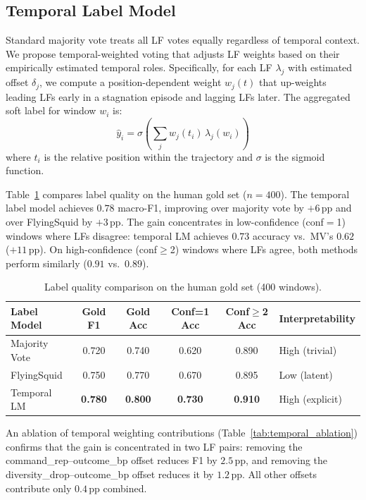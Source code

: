 \documentclass[11pt]{article}
\begin{document}
\subsection{Temporal Label Model}
\label{sec:temporal_lm}

Standard majority vote treats all LF votes equally regardless of temporal context.
We propose temporal-weighted voting that adjusts LF weights based on their empirically estimated temporal roles.
Specifically, for each LF $\lambda_j$ with estimated offset $\delta_j$, we compute a position-dependent weight $w_j(t)$ that up-weights leading LFs early in a stagnation episode and lagging LFs later.
The aggregated soft label for window $w_i$ is:
\[
\hat{y}_i = \sigma\!\left(\sum_{j} w_j(t_i)\, \lambda_j(w_i)\right)
\]
where $t_i$ is the relative position within the trajectory and $\sigma$ is the sigmoid function.

Table~\ref{tab:label_quality} compares label quality on the human gold set ($n = 400$).
The temporal label model achieves $0.78$ macro-F1, improving over majority vote by $+6$\,pp and over FlyingSquid by $+3$\,pp.
The gain concentrates in low-confidence (conf$=$1) windows where LFs disagree: temporal LM achieves $0.73$ accuracy vs.\ MV's $0.62$ ($+11$\,pp).
On high-confidence (conf$\geq$2) windows where LFs agree, both methods perform similarly ($0.91$ vs.\ $0.89$).

\begin{table}[t]
\centering
\caption{Label quality comparison on the human gold set (400 windows).}
\label{tab:label_quality}
\small
\begin{tabular}{lccccl}
\toprule
Label Model & Gold F1 & Gold Acc & Conf=1 Acc & Conf$\geq$2 Acc & Interpretability \\
\midrule
Majority Vote & 0.720 & 0.740 & 0.620 & 0.890 & High (trivial) \\
FlyingSquid & 0.750 & 0.770 & 0.670 & 0.895 & Low (latent) \\
Temporal LM & \textbf{0.780} & \textbf{0.800} & \textbf{0.730} & \textbf{0.910} & High (explicit) \\
\bottomrule
\end{tabular}
\end{table}

An ablation of temporal weighting contributions (Table~\ref{tab:temporal_ablation}) confirms that the gain is concentrated in two LF pairs: removing the command\_rep--outcome\_bp offset reduces F1 by $2.5$\,pp, and removing the diversity\_drop--outcome\_bp offset reduces it by $1.2$\,pp.
All other offsets contribute only $0.4$\,pp combined.
\end{document}
